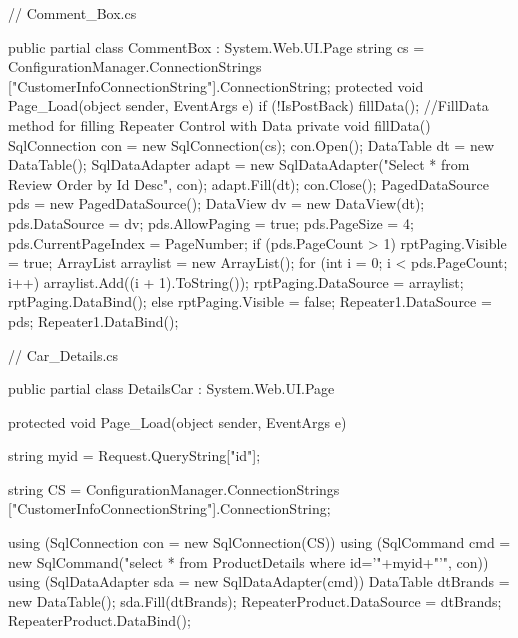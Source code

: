 \newpage

\begin{spverbatim}
// Comment_Box.cs

public partial class CommentBox : System.Web.UI.Page
{
    string cs = ConfigurationManager.ConnectionStrings
["CustomerInfoConnectionString"].ConnectionString;
    protected void Page_Load(object sender, EventArgs e)
    {
        if (!IsPostBack)
        {
            fillData();
        }
    }
    //FillData method for filling Repeater Control with Data
    private void fillData()
    {
        SqlConnection con = new SqlConnection(cs);
        con.Open();
        DataTable dt = new DataTable();
        SqlDataAdapter adapt = new SqlDataAdapter("Select * from Review Order by Id Desc", con);
        adapt.Fill(dt);
        con.Close();
        PagedDataSource pds = new PagedDataSource();
        DataView dv = new DataView(dt);
        pds.DataSource = dv;
        pds.AllowPaging = true;
        pds.PageSize = 4;
        pds.CurrentPageIndex = PageNumber;
        if (pds.PageCount > 1)
        {
            rptPaging.Visible = true;
            ArrayList arraylist = new ArrayList();
            for (int i = 0; i < pds.PageCount; i++)
                arraylist.Add((i + 1).ToString());
            rptPaging.DataSource = arraylist;
            rptPaging.DataBind();
        }
        else
        {
            rptPaging.Visible = false;
        }
        Repeater1.DataSource = pds;
        Repeater1.DataBind();
    }
}
\end{spverbatim}

\newpage

\begin{spverbatim}
// Car_Details.cs

public partial class DetailsCar : System.Web.UI.Page
{
    protected void Page_Load(object sender, EventArgs e)
    {
        string myid =  Request.QueryString["id"];

        string CS = ConfigurationManager.ConnectionStrings
["CustomerInfoConnectionString"].ConnectionString;

        using (SqlConnection con = new SqlConnection(CS))
        {
            using (SqlCommand cmd = new SqlCommand("select * from ProductDetails where id='"+myid+"'", con))
            {
                using (SqlDataAdapter sda = new SqlDataAdapter(cmd))
                {
                    DataTable dtBrands = new DataTable();
                    sda.Fill(dtBrands);
                    RepeaterProduct.DataSource = dtBrands;
                    RepeaterProduct.DataBind();
                }
            }
        }
    }
}
\end{spverbatim}
\newpage

